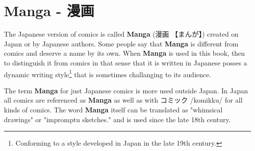 \section{Manga - 漫画} \label{sec:Manga}

The Japanese version of comics is called \textbf{Manga} ({漫画} {【まんが】})
created on Japan or by Japanese authors. Some people say that \textbf{Manga} is
different from comics and deserve a name by its own. When \textbf{Manga} is
used in this book, then to distinguish it from comics in that sense that it is
written in Japanese posses a dynamic writing style\footnote{Conforming to a
style developed in Japan in the late 19th century.}  that is sometimes
challanging to its audience.

The term \textbf{Manga} for just Japanese comics is more used outside Japan. In
Japan all comics are referenced as \textbf{Manga} as well as with {コミック}
/komikku/ for all kinds of comics. The word \textbf{Manga} itself can be
translated as "whimsical drawings" or "impromptu sketches." and is used since
the late 18th century.


